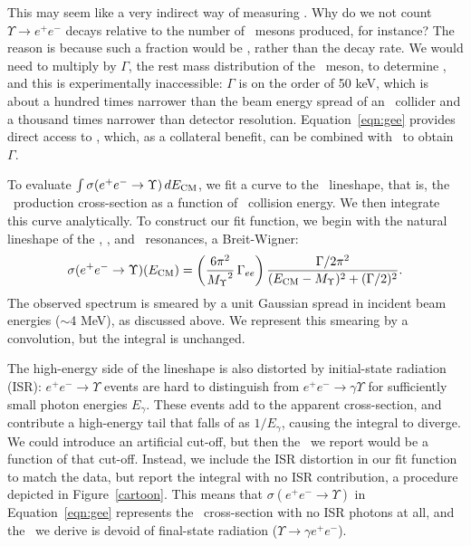 \documentclass{cornell}
\begin{document}
This may seem like a very indirect way of measuring \gee.  Why do we
not count $\Upsilon \to e^+e^-$ decays relative to the number of \ups\
mesons produced, for instance?  The reason is because such a fraction
would be \bee, rather than the decay rate.  We would need to multiply
by $\Gamma$, the rest mass distribution of the \ups\ meson, to
determine \gee, and this is experimentally inaccessible: $\Gamma$ is
on the order of 50 keV, which is about a hundred times narrower than
the beam energy spread of an \ee\ collider and a thousand times
narrower than detector resolution.  Equation~\ref{eqn:gee} provides
direct access to \gee, which, as a collateral benefit, can be combined
with \bee\ to obtain $\Gamma$.

To evaluate $\int \sigma(e^+e^- \to \Upsilon) \, dE_{\mbox{\scriptsize CM}}$, we fit
a curve to the \ups\ lineshape, that is, the \ups\ production
cross-section as a function of \ee\ collision energy.  We then
integrate this curve analytically.  To construct our fit function, we
begin with the natural lineshape of the \us, \uss, and \usss\
resonances, a Breit-Wigner:
\begin{equation}
  \sigma(e^+e^- \to \Upsilon)(E_{\mbox{\scriptsize CM}}) = \left(
  \frac{6\pi^2}{{M_\Upsilon}^2} \, \Gamma_{ee} \right)
  \frac{\Gamma/2\pi^2}{(E_{\mbox{\scriptsize CM}} - M_\Upsilon)^2 + (\Gamma/2)^2} \mbox{.}
  \label{eqn:breitwigner}
\end{equation}
The observed spectrum is smeared by a unit Gaussian spread in incident
beam energies ($\sim$4 MeV), as discussed above.  We represent this
smearing by a convolution, but the integral is unchanged.

The high-energy side of the lineshape is also distorted by
initial-state radiation (ISR): $e^+e^- \to \Upsilon$ events are hard
to distinguish from $e^+e^- \to \gamma \Upsilon$ for sufficiently
small photon energies $E_\gamma$.  These events add to the apparent
cross-section, and contribute a high-energy tail that falls of as
$1/E_\gamma$, causing the integral to diverge.  We could introduce an
artificial cut-off, but then the \gee\ we report would be a function
of that cut-off.  Instead, we include the ISR distortion in our fit
function to match the data, but report the integral with no ISR
contribution, a procedure depicted in Figure~\ref{cartoon}.  This
means that $\sigma(e^+e^- \to \Upsilon)$ in Equation~\ref{eqn:gee}
represents the \ups\ cross-section with no ISR photons at all, and the
\gee\ we derive is devoid of final-state radiation ($\Upsilon \to
\gamma e^+e^-$).
\end{document}
